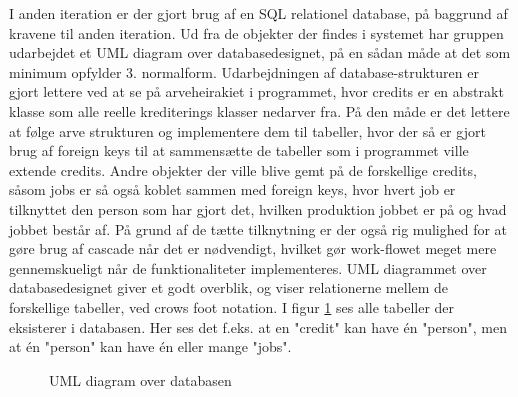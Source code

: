 I anden iteration er der gjort brug af en SQL relationel database, på baggrund af kravene til anden iteration. Ud fra de objekter der findes i systemet har gruppen udarbejdet et UML diagram over databasedesignet, på en sådan måde at det som minimum opfylder 3. normalform. Udarbejdningen af database-strukturen er gjort lettere ved at se på arveheirakiet i programmet, hvor credits er en abstrakt klasse som alle reelle krediterings klasser nedarver fra. På den måde er det lettere at følge arve strukturen og implementere dem til tabeller, hvor der så er gjort brug af foreign keys til at sammensætte de tabeller som i programmet ville extende credits. Andre objekter der ville blive gemt på de forskellige credits, såsom jobs er så også koblet sammen med foreign keys, hvor hvert job er tilknyttet den person som har gjort det, hvilken produktion jobbet er på og hvad jobbet består af. På grund af de tætte tilknytning er der også rig mulighed for at gøre brug af cascade når det er nødvendigt, hvilket gør work-flowet meget mere gennemskueligt når de funktionaliteter implementeres.
UML diagrammet over databasedesignet giver et godt overblik, og viser relationerne mellem de forskellige tabeller, ved crows foot notation. I figur \ref{fig:databaseUML} ses alle tabeller der eksisterer i databasen. Her ses det f.eks. at en "credit" kan have én "person", men at én "person" kan have én eller mange "jobs".
\begin{figure}[H]
    \centering
    \caption{UML diagram over databasen}
    \label{fig:databaseUML}
\end{figure}